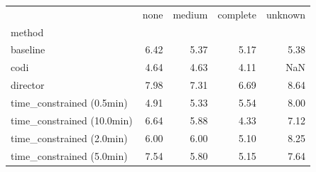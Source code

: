 \begin{tabular}{lrrrr}
\toprule
 & none & medium & complete & unknown \\
method &  &  &  &  \\
\midrule
baseline & 6.42 & 5.37 & 5.17 & 5.38 \\
codi & 4.64 & 4.63 & 4.11 & NaN \\
director & 7.98 & 7.31 & 6.69 & 8.64 \\
time_constrained (0.5min) & 4.91 & 5.33 & 5.54 & 8.00 \\
time_constrained (10.0min) & 6.64 & 5.88 & 4.33 & 7.12 \\
time_constrained (2.0min) & 6.00 & 6.00 & 5.10 & 8.25 \\
time_constrained (5.0min) & 7.54 & 5.80 & 5.15 & 7.64 \\
\bottomrule
\end{tabular}
